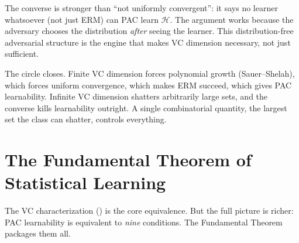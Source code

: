 \begin{remark}
\label{rmk:converse-strength}
The converse is stronger than ``not uniformly convergent'': it says no learner
whatsoever (not just ERM) can PAC learn $\mathcal{H}$.  The argument works
because the adversary chooses the distribution \emph{after} seeing the learner.
This distribution-free adversarial structure is the engine that makes VC
dimension necessary, not just sufficient.
\end{remark}

The circle closes.  Finite VC dimension forces polynomial growth
(Sauer--Shelah), which forces uniform convergence, which makes ERM
succeed, which gives PAC learnability.  Infinite VC dimension shatters
arbitrarily large sets, and the converse kills learnability outright.
A single combinatorial quantity, the largest set the class can
shatter, controls everything.



\section{The Fundamental Theorem of Statistical Learning}
\label{sec:fundamental}

The VC characterization () is the core equivalence.  But the
full picture is richer: PAC learnability is equivalent to \emph{nine}
conditions.  The Fundamental Theorem packages them all.

